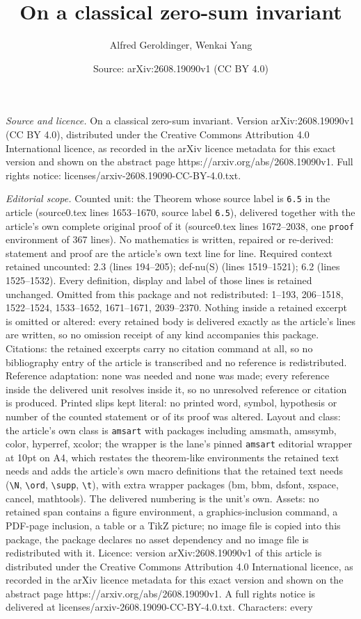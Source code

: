 \documentclass[10pt,a4paper]{amsart}
\title[On a classical zero-sum invariant]{On a classical zero-sum invariant}
\author{Alfred Geroldinger, Wenkai Yang}
\date{Source: arXiv:2608.19090v1 (CC BY 4.0)}
\begin{document}
\maketitle

\noindent\emph{Source and licence.} On a classical zero-sum invariant. Version arXiv:2608.19090v1 (CC BY 4.0), distributed under the Creative Commons Attribution 4.0 International licence, as recorded in the arXiv licence metadata for this exact version and shown on the abstract page https://arxiv.org/abs/2608.19090v1. Full rights notice: licenses/arxiv-2608.19090-CC-BY-4.0.txt.\par\smallskip

\noindent\textit{Editorial scope.} Counted unit: the Theorem whose source label is \texttt{6.5} in the article (source0.tex lines 1653--1670, source label \texttt{6.5}), delivered together with the article's own complete original proof of it (source0.tex lines 1672--2038, one \texttt{proof} environment of 367 lines). No mathematics is written, repaired or re-derived: statement and proof are the article's own text line for line. Required context retained uncounted: 2.3 (lines 194--205); def-nu(S) (lines 1519--1521); 6.2 (lines 1525--1532). Every definition, display and label of those lines is retained unchanged. Omitted from this package and not redistributed: 1--193, 206--1518, 1522--1524, 1533--1652, 1671--1671, 2039--2370. Nothing inside a retained excerpt is omitted or altered: every retained body is delivered exactly as the article's lines are written, so no omission receipt of any kind accompanies this package. Citations: the retained excerpts carry no citation command at all, so no bibliography entry of the article is transcribed and no reference is redistributed. Reference adaptation: none was needed and none was made; every reference inside the delivered unit resolves inside it, so no unresolved reference or citation is produced. Printed slips kept literal: no printed word, symbol, hypothesis or number of the counted statement or of its proof was altered. Layout and class: the article's own class is \texttt{amsart} with packages including amsmath, amssymb, color, hyperref, xcolor; the wrapper is the lane's pinned \texttt{amsart} editorial wrapper at 10pt on A4, which restates the theorem-like environments the retained text needs and adds the article's own macro definitions that the retained text needs (\texttt{\textbackslash N}, \texttt{\textbackslash ord}, \texttt{\textbackslash supp}, \texttt{\textbackslash t}), with extra wrapper packages (bm, bbm, dsfont, xspace, cancel, mathtools). The delivered numbering is the unit's own. Assets: no retained span contains a figure environment, a graphics-inclusion command, a PDF-page inclusion, a table or a TikZ picture; no image file is copied into this package, the package declares no asset dependency and no image file is redistributed with it. Licence: version arXiv:2608.19090v1 of this article is distributed under the Creative Commons Attribution 4.0 International licence, as recorded in the arXiv licence metadata for this exact version and shown on the abstract page https://arxiv.org/abs/2608.19090v1. A full rights notice is delivered at licenses/arxiv-2608.19090-CC-BY-4.0.txt. Characters: every 
\end{document}
